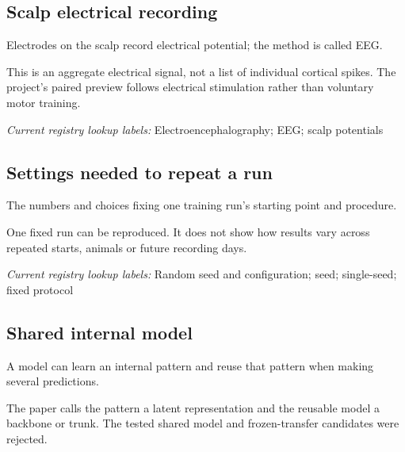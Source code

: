 \begin{samepage}
\subsection*{Scalp electrical recording}
\noindent Electrodes on the scalp record electrical potential; the method is called EEG.\par
\end{samepage}
\begin{samepage}
\noindent This is an aggregate electrical signal, not a list of individual cortical spikes. The project’s paired preview follows electrical stimulation rather than voluntary motor training.\par\nopagebreak[4]

\end{samepage}


\noindent\textit{Current registry lookup labels:} Electroencephalography; EEG; scalp potentials\par

\begin{samepage}
\subsection*{Settings needed to repeat a run}
\noindent The numbers and choices fixing one training run’s starting point and procedure.\par
\end{samepage}
\begin{samepage}
\noindent One fixed run can be reproduced. It does not show how results vary across repeated starts, animals or future recording days.\par\nopagebreak[4]

\end{samepage}


\noindent\textit{Current registry lookup labels:} Random seed and configuration; seed; single-seed; fixed protocol\par

\begin{samepage}
\subsection*{Shared internal model}
\noindent A model can learn an internal pattern and reuse that pattern when making several predictions.\par
\end{samepage}
\begin{samepage}
\noindent The paper calls the pattern a latent representation and the reusable model a backbone or trunk. The tested shared model and frozen-transfer candidates were rejected.\par\nopagebreak[4]

\end{samepage}


